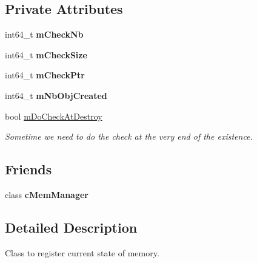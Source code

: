 \subsection*{Private Attributes}
\begin{DoxyCompactItemize}
\item 
int64\+\_\+t {\bfseries m\+Check\+Nb}\hypertarget{classMMVII_1_1cMemState_afd31b09f13afe38470cd80c8869fb1ba}{}\label{classMMVII_1_1cMemState_afd31b09f13afe38470cd80c8869fb1ba}

\item 
int64\+\_\+t {\bfseries m\+Check\+Size}\hypertarget{classMMVII_1_1cMemState_a5742f641bb6fddf75aed8f66628bb77e}{}\label{classMMVII_1_1cMemState_a5742f641bb6fddf75aed8f66628bb77e}

\item 
int64\+\_\+t {\bfseries m\+Check\+Ptr}\hypertarget{classMMVII_1_1cMemState_a2e2d0c68ebe3a992ea071f7f538bd8a2}{}\label{classMMVII_1_1cMemState_a2e2d0c68ebe3a992ea071f7f538bd8a2}

\item 
int64\+\_\+t {\bfseries m\+Nb\+Obj\+Created}\hypertarget{classMMVII_1_1cMemState_aa6700701c1d77f948f6dfec32510eeb2}{}\label{classMMVII_1_1cMemState_aa6700701c1d77f948f6dfec32510eeb2}

\item 
bool \hyperlink{classMMVII_1_1cMemState_a5598a6476aad9a0763af353783700e4c}{m\+Do\+Check\+At\+Destroy}\hypertarget{classMMVII_1_1cMemState_a5598a6476aad9a0763af353783700e4c}{}\label{classMMVII_1_1cMemState_a5598a6476aad9a0763af353783700e4c}

\begin{DoxyCompactList}\small\item\em Sometime we need to do the check at the very end of the existence. \end{DoxyCompactList}\end{DoxyCompactItemize}
\subsection*{Friends}
\begin{DoxyCompactItemize}
\item 
class {\bfseries c\+Mem\+Manager}\hypertarget{classMMVII_1_1cMemState_afa164685de3acfa66d440d2e16b691f6}{}\label{classMMVII_1_1cMemState_afa164685de3acfa66d440d2e16b691f6}

\end{DoxyCompactItemize}


\subsection{Detailed Description}
Class to register current state of memory. 

